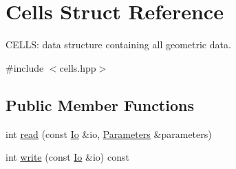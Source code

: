\hypertarget{structCells}{}\section{Cells Struct Reference}
\label{structCells}


C\+E\+L\+LS\+: data structure containing all geometric data.  




{\ttfamily \#include $<$cells.\+hpp$>$}

\subsection*{Public Member Functions}
\begin{DoxyCompactItemize}
\item 
int \mbox{\hyperlink{structCells_a280e3eca7c52ea570a28d9b1d491f241}{read}} (const \mbox{\hyperlink{structIo}{Io}} \&io, \mbox{\hyperlink{classParameters}{Parameters}} \&parameters)
\item 
int \mbox{\hyperlink{structCells_a7dca95accb0521eca543b40beffc7461}{write}} (const \mbox{\hyperlink{structIo}{Io}} \&io) const
\end{DoxyCompactItemize}
